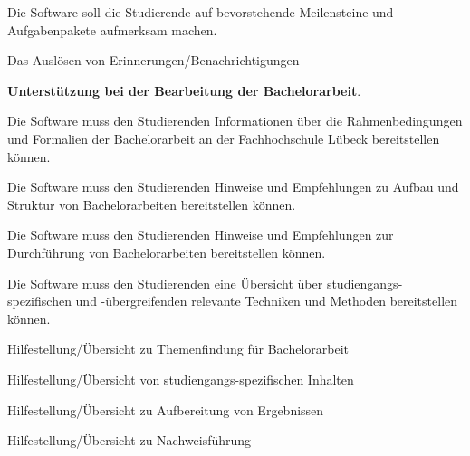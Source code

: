 \documentclass[bibliography=totoc,listof=totoc,BCOR=5mm,DIV=12,oneside]{scrbook}
\begin{document}
\begin{enumerate} [label=\textbf{PR\arabic*}]
\begin{enumerate} [label=\textit{[Req1.\arabic*]}]
\bigskip
\item \label{anf:erinnerungenBenachrichtigungen}Die Software soll die Studierende auf bevorstehende Meilensteine und Aufgabenpakete aufmerksam machen.

\begin{enumerate} [label=\textit{[Req1.3.\arabic*]}]
\item \label{uanf:erinnerungAusloesen}Das Auslösen von Erinnerungen/Benachrichtigungen
\end{enumerate}
\end{enumerate}

\newpage
\item \label{prod:unterstuetzungBachelorarbeit} \textbf{Unterstützung bei der Bearbeitung der Bachelorarbeit}.
\begin{enumerate} [label=\textit{[Req2.\arabic*]}]

\item \label{anf:infRahmenbedingungenFormalien} Die Software muss den Studierenden Informationen über die Rahmenbedingungen und Formalien der Bachelorarbeit an der Fachhochschule Lübeck bereitstellen können.

\bigskip
\item \label{anf:infAufbauStruktur} Die Software muss den Studierenden Hinweise und Empfehlungen zu Aufbau und Struktur von Bachelorarbeiten bereitstellen können.

\bigskip
\item \label{anf:infDurchfuerungBachelorarbeit} Die Software muss den Studierenden Hinweise und Empfehlungen zur Durchführung von Bachelorarbeiten bereitstellen können.

\bigskip
\item \label{anf:infMethodenTechniken} Die Software muss den Studierenden eine Übersicht über studiengangs-spezifischen und -übergreifenden relevante Techniken und Methoden bereitstellen können.

\begin{enumerate} [label=\textit{[Req2.4.\arabic*]}]
\item \label{uanf:infThemenfindung} Hilfestellung/Übersicht zu Themenfindung für Bachelorarbeit
\item \label{uanf:infInhalt} Hilfestellung/Übersicht von studiengangs-spezifischen Inhalten
\item \label{uanf:infAufbereitungErgebnisse} Hilfestellung/Übersicht zu Aufbereitung von Ergebnissen
\item \label{uanf:infNachweisfuerung} Hilfestellung/Übersicht zu Nachweisführung
\end{enumerate}


\end{enumerate}
\end{enumerate}
\end{document}
